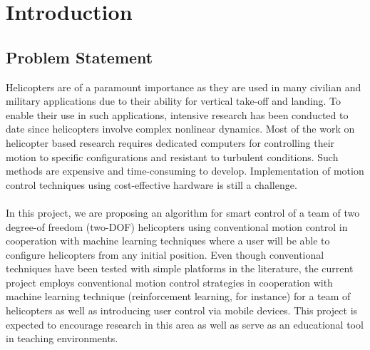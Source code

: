 \chapter{Introduction}

\section{Problem Statement}
Helicopters are of a paramount importance as
they are used in many civilian and military applications due to their ability for vertical take-off and landing. To enable their use in such applications, intensive research has been conducted to date since helicopters involve complex nonlinear dynamics. Most of the work on helicopter based research requires dedicated computers for controlling their motion to specific configurations and resistant to turbulent conditions. Such methods are expensive and time-consuming to develop. Implementation of motion control techniques using cost-effective hardware is still a challenge.\\ 
\\
In this project, we are proposing an algorithm for smart control of a team of two degree-of freedom (two-DOF) helicopters using conventional motion control in cooperation with machine learning techniques where a user will be able to configure helicopters from any initial position. Even though conventional techniques have been tested with simple platforms in the literature, the current project employs conventional motion control strategies in cooperation with machine learning technique (reinforcement learning, for instance) for a team of helicopters as well as introducing user control via mobile devices. This project is expected to encourage research in this area as well as serve as an educational tool in teaching environments.



